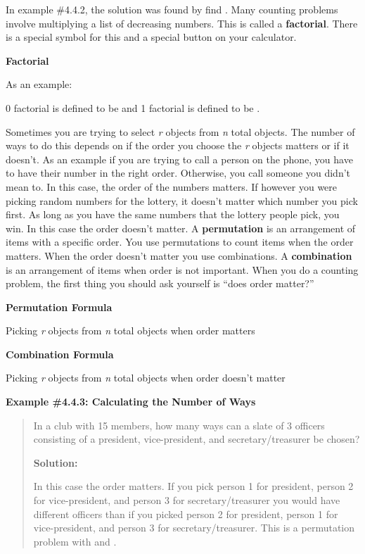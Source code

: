 \documentclass[]{book}
\begin{document}
In example \#4.4.2, the solution was found by find . Many counting
problems involve multiplying a list of decreasing numbers. This is
called a \textbf{factorial}. There is a special symbol for this and a special
button on your calculator.

\textbf{Factorial}

As an example:

0 factorial is defined to be and 1 factorial is defined to be .

Sometimes you are trying to select \emph{r} objects from \emph{n} total objects.
The number of ways to do this depends on if the order you choose the \emph{r}
objects matters or if it doesn't. As an example if you are trying to
call a person on the phone, you have to have their number in the right
order. Otherwise, you call someone you didn't mean to. In this case, the
order of the numbers matters. If however you were picking random numbers
for the lottery, it doesn't matter which number you pick first. As long
as you have the same numbers that the lottery people pick, you win. In
this case the order doesn't matter. A \textbf{permutation} is an arrangement
of items with a specific order. You use permutations to count items when
the order matters. When the order doesn't matter you use combinations. A
\textbf{combination} is an arrangement of items when order is not important.
When you do a counting problem, the first thing you should ask yourself
is ``does order matter?''

\textbf{Permutation Formula}

Picking \emph{r} objects from \emph{n} total objects when order matters

\textbf{Combination Formula}

Picking \emph{r} objects from \emph{n} total objects when order doesn't matter

\textbf{Example \#4.4.3: Calculating the Number of Ways}

\begin{quote}
In a club with 15 members, how many ways can a slate of 3 officers
consisting of a president, vice-president, and secretary/treasurer be
chosen?

\textbf{Solution:}

In this case the order matters. If you pick person 1 for president, person 2 for vice-president, and person 3 for secretary/treasurer you would have different officers than if you picked person 2 for president, person 1 for vice-president, and person 3 for secretary/treasurer. This is a permutation problem with and .
\end{quote}
\end{document}
